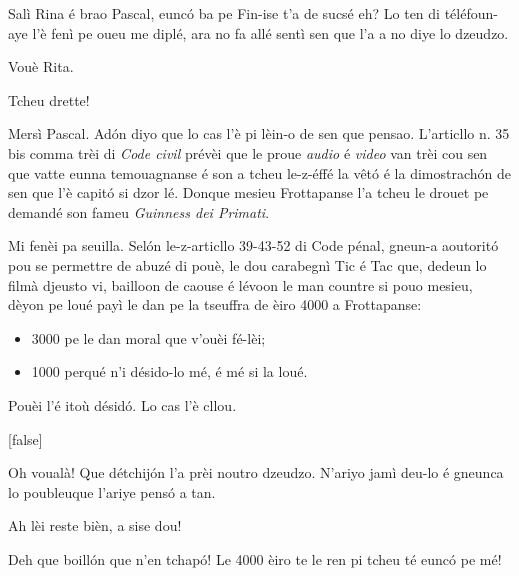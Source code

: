 \begin{drama}
\Ritaspeaks Salì Rina é brao Pascal, eunc\'o ba pe Fin-ise t’a de sucsé eh? Lo ten di téléfoun-aye l’è fenì pe oueu me diplé, ara no fa allé sentì sen que l’a a no diye lo dzeudzo.

\Pascalspeaks Vouè Rita.



\Pascalspeaks Tcheu drette!


\DzeudzoSenliquerspeaks Mersì Pascal. Adón diyo que lo cas l'è pi lèin-o de sen que pensao. L'articllo n. 35 bis comma trèi di \textit{Code civil} prévèi que le proue \textit{audio} é \textit{video} van trèi cou sen que vatte eunna temouagnanse é son a tcheu le-z-éffé la v\^etó é la dimostrachón de sen que l’è capitó si dzor lé. Donque mesieu Frottapanse l'a tcheu le drouet pe demandé son fameu \textit{Guinness dei Primati}.


\DzeudzoSenliquerspeaks Mi fenèi pa seuilla. Selón le-z-articllo 39-43-52 di Code pénal, gneun-a aoutoritó pou se permettre de abuzé di pouè, le dou carabegnì Tic é Tac que, dedeun lo filmà djeusto vi, bailloon de caouse é lévoon le man countre si pouo mesieu, dèyon pe loué payì le dan pe la tseuffra de èiro 4000 a Frottapanse: 
\begin{itemize}
\item[$\bullet$] 3000 pe le dan moral que v'ouèi fé-lèi;
\item[$\bullet$] 1000 perqué n’i désido-lo mé, é mé si la loué.
\end{itemize}
Pouèi l'é itoù désidó. Lo cas l'è cllou.

[false]


\Ritaspeaks Oh voualà! Que détchijón l’a prèi  noutro dzeudzo. N'ariyo jamì deu-lo é gneunca lo poubleuque l'ariye pensó a tan.

\Cienspeaks Ah lèi reste bièn, a sise dou!

\Ticspeaks{} Deh que boillón que n'en tchapó! Le 4000 èiro te le ren pi tcheu té eunc\'o pe mé!


\end{drama}

